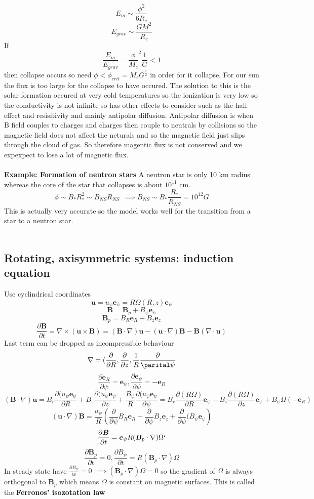 \documentclass{article}
\begin{document}
$$
E_m \sim \frac{\phi^2}{6R_c}
$$
$$
E_{grav} \sim \frac{GM^2}{R_c}
$$
If
$$
\frac{E_m}{E_{grav}} = \frac{\phi}{M_c}^2\frac{1}{G} < 1
$$
then collapse occurs so need $\phi < \phi_{crit} = M_cG^{\frac{1}{2}}$ in order for it collapse. For our sun the flux is too large for the collapse to have occured. The solution to this is the solar formation occured at very cold temperatures so the ionization is very low so the conductivity is not infinite so has other effects to consider such as the hall effect and resisitivity and mainly antipolar diffusion. Antipolar diffusion is when B field couples to charges and charges then couple to neutrals by collisions so the magnetic field does not affect the neturals and so the magnetic field just slips through the cloud of gas. So therefore magentic flux is not conserved and we expexpect to lose a lot of magnetic flux.
\\\\
\textbf{Example: Formation of neutron stars}
A neutron star is only 10 km radius whereas the core of the star that collapses is about $10^{11}$ cm.
$$
\phi \sim B_*R_*^2 \sim B_{NS}R_{NS} \>\> \implies B_{NS} \sim B_*\frac{R_*}{R_{NS}} = 10^{12}G
$$
This is actually very accurate so the model works well for the transition from a star to a neutron star.\\\\
\subsection{Rotating, axisymmetric systems: induction equation}
Use cyclindrical coordinates
$$
\bm u = u_{\psi} \bm e_{\psi} = R \Omega(R,z) \bm e_{\psi}
$$
$$
\bm B = \bm B_p + B_{\psi}\bm e_{\psi}
$$
$$
\bm B_p = B_R \bm e_R + B_z \bm e_z
$$
$$
\frac{\partial \bm B}{\partial t} = \nabla \times (\bm u \times \bm B) = (\bm B \cdot \nabla ) \bm u - (\bm u \cdot \nabla) \bm B - \bm B (\nabla \cdot \bm u)
$$
Last term can be dropped as incompressible behaviour
$$
\nabla = (\frac{\partial}{\partial R}, \frac{\partial}{\partial z}, \frac{1}{R}\frac{\partial}{\parital \psi}
$$$$
\frac{\partial \bm e_R}{\partial \psi} = \bm e_{\psi}, \frac{\partial \bm e_{\psi}}{\partial \psi} = - \bm e_R
$$
$$
(\bm B \cdot \nabla) \bm u = B_r\frac{\partial(u_{\psi} \bm e_{\psi}}{\partial R} + B_z \frac{\partial(u_{\psi} \bm e_{\psi}}{\partial z} + \frac{B_{\psi}}{R} \frac{\partial(u_{\psi} \bm e_{\psi}}{\partial \psi} = B_r \frac{\partial (R\Omega)}{\partial R} \bm e_{\psi}+ B_z \frac{\partial (R\Omega)}{\partial z} \bm e_{\psi} + B_{\psi} \Omega(-\bm e_R) 
$$
$$
(\bm u \cdot \nabla) \bm B = \frac{u_{\psi}}{R} \left( \frac{\partial }{\partial \psi} B_R \bm e_R + \frac{\partial}{\partial \psi}B_z \bm e_z + \frac{\partial }{\partial \psi} (B_{\psi} \bm e_{\psi}\right)
$$
$$
\frac{\partial \bm B}{\partial t} = \bm e_{\psi} R (\bm B_p \cdot \nabla) \Omega` 
$$
$$
\frac{\partial \bm B_p}{\partial t} = 0, \frac{\partial B_{\psi}}{\partial t} = R(\bm B_p \cdot \nabla) \Omega
$$
In steady state have $ \frac{\partial B_{\psi}}{\partial t}  = 0$ $ \implies (\bm B_p \cdot \nabla) \Omega = 0$ so the gradient of $\Omega$ is always orthogonal to $\bm B_p$ which means $\Omega$ is constant on magnetic surfaces. This is called the \textbf{Ferronos' isozotation law}
\end{document}
